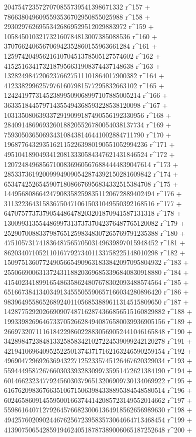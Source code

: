        2047547235727070855739541398671332 r^157 + 
       7866380496095593536702950855025988 r^158 + 
       29302976269553426869529512029883972 r^159 + 
       105845010321732160784813007385088536 r^160 + 
       370766240656706942352860155963661284 r^161 + 
       1259742049562161070451378505127574602 r^162 + 
       4152516341732187956631908374437148638 r^163 + 
       13282498472062376627511101864017900382 r^164 + 
       41233829962579761607981577295832663102 r^165 + 
       124241977314523899509068997107885005214 r^166 + 
       363351844579714355494368593228538120098 r^167 + 
       1031350806393372919099187490556192330956 r^168 + 
       2840914869693260188205526780054038137734 r^169 + 
       7593050365069343108438146441002884711790 r^170 + 
       19687764329351621152263980190551052994236 r^171 + 
       49510418904934120813330584347621431846524 r^172 + 
       120724849685671008369605676884444839047614 r^173 + 
       285337361920099949090542874392150281609842 r^174 + 
       653474252654590718086676956834332515384708 r^175 + 
       1449568086642479083582598351120672889402494 r^176 + 
       3113223643158367504710615031049550392168516 r^177 + 
       6470757737379054486478203201870941587131318 r^178 + 
       13009931355448699731373737042376487765120082 r^179 + 
       25290700883379876512598348307265769791235388 r^180 + 
       47510573174183648756570503149639897015948452 r^181 + 
       86203407105211016779273401133758225148010298 r^182 + 
       150975136077249056654909631833842097095804932 r^183 + 
       255066900631372431188203696853396840830918880 r^184 + 
       415402341899165486358624807678302093488574564 r^185 + 
       651667384134034913455505590657166034280896420 r^186 + 
       983964955865268924011056853889611314515809650 r^187 + 
       1428775292026690907487162874366856515160829882 r^188 + 
       1993398269646733705266284940876580039936905156 r^189 + 
       2669732071116184229860228830569052441046165848 r^190 + 
       3428984723848133258583421027224539099242120278 r^191 + 
       4219410696409525225013743717162163246590259154 r^192 + 
       4969047296926369432271252335745126467620329034 r^193 + 
       5594449587267660303393283099735951472621384190 r^194 + 
       6014662323477924560303796513206909730134069922 r^195 + 
       6167620983676635106715063984338895384548580514 r^196 + 
       6024658609145595001663744142085723149552014662 r^197 + 
       5598616407127926457668230061364918562656989630 r^198 + 
       4942576020902446762567239583573064664713468454 r^199 + 
       4139075065428591946240518787389006065187252648 r^200 + 
